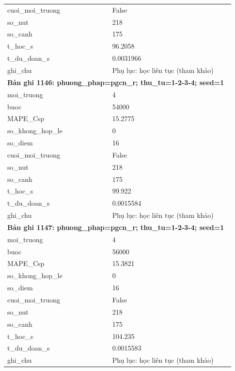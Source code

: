 \begin{longtable}{p{0.43\linewidth}p{0.50\linewidth}}
cuoi\_\allowbreak moi\_\allowbreak truong & False \\
so\_\allowbreak nut & 218 \\
so\_\allowbreak canh & 175 \\
t\_\allowbreak hoc\_\allowbreak s & 96.2058 \\
t\_\allowbreak du\_\allowbreak doan\_\allowbreak s & 0.0031966 \\
ghi\_\allowbreak chu & Phụ lục: học liên tục (tham khảo) \\
\midrule
\multicolumn{2}{p{0.95\linewidth}}{\textbf{Bản ghi 1146: phuong\_phap=pgcn\_r; thu\_tu=1-2-3-4; seed=1}} \\
moi\_\allowbreak truong & 4 \\
buoc & 54000 \\
MAPE\_\allowbreak Csp & 15.2775 \\
so\_\allowbreak khong\_\allowbreak hop\_\allowbreak le & 0 \\
so\_\allowbreak diem & 16 \\
cuoi\_\allowbreak moi\_\allowbreak truong & False \\
so\_\allowbreak nut & 218 \\
so\_\allowbreak canh & 175 \\
t\_\allowbreak hoc\_\allowbreak s & 99.922 \\
t\_\allowbreak du\_\allowbreak doan\_\allowbreak s & 0.0015584 \\
ghi\_\allowbreak chu & Phụ lục: học liên tục (tham khảo) \\
\midrule
\multicolumn{2}{p{0.95\linewidth}}{\textbf{Bản ghi 1147: phuong\_phap=pgcn\_r; thu\_tu=1-2-3-4; seed=1}} \\
moi\_\allowbreak truong & 4 \\
buoc & 56000 \\
MAPE\_\allowbreak Csp & 15.3821 \\
so\_\allowbreak khong\_\allowbreak hop\_\allowbreak le & 0 \\
so\_\allowbreak diem & 16 \\
cuoi\_\allowbreak moi\_\allowbreak truong & False \\
so\_\allowbreak nut & 218 \\
so\_\allowbreak canh & 175 \\
t\_\allowbreak hoc\_\allowbreak s & 104.235 \\
t\_\allowbreak du\_\allowbreak doan\_\allowbreak s & 0.0015583 \\
ghi\_\allowbreak chu & Phụ lục: học liên tục (tham khảo) \\

\end{longtable}
